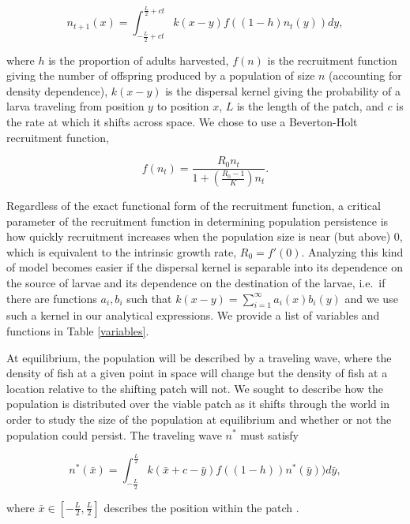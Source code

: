\documentclass[12pt,english]{article}
\begin{document}
\begin{spacing}{1.9}
\begin{flushleft}
\begin{equation}
n_{t+1}(x)=\int^{\frac{L}{2}+ct}_{-\frac{L}{2}+ct}k(x-y)f((1-h)n_t(y))dy \label{integrodifference},
\end{equation}

\noindent where $h$ is the proportion of adults harvested, $f(n)$ is the recruitment function giving the number of 
offspring produced by a population of size $n$ (accounting for density dependence), $k(x-y)$ is the dispersal kernel giving the probability of a  larva traveling from position $y$ to position $x$, $L$ is the length of the patch, and $c$ is the rate at which it  shifts across space.  We chose to use a Beverton-Holt recruitment function,

\[f(n_t)=\frac{R_0n_t}{1+\left(\frac{R_0-1}{K}\right)n_t}.\]  

\noindent Regardless of the exact functional form of the recruitment function, a critical parameter of the recruitment function in determining population persistence is how quickly recruitment increases when the population 
size is near (but above) $0$, which is equivalent to the intrinsic growth rate, $R_0=f'(0)$.  Analyzing this kind of model becomes easier if the dispersal kernel is separable into its dependence on the source of larvae and its dependence on the destination of the larvae, i.e.~if there are functions $a_i, b_i$ such that $k(x- y) = \sum^\infty_{i=1} a_i(x)b_i(y)$ and we use such a kernel in our analytical expressions. We provide a list of variables and functions in Table \ref{variables}. 

At equilibrium, the population will be described by a traveling wave, 
where the density of fish at a given point in space will change but the density of fish at a location relative to the 
shifting  patch will not. We sought to describe how the population is distributed over the viable 
patch as it shifts through the world in order to study the size of the population at equilibrium and whether or not the population could persist.  The traveling wave $n^*$ must 
satisfy

\begin{equation}
n^*(\bar{x})=\int^{\frac{L}{2}}_{-\frac{L}{2}}k(\bar{x}+c-\bar{y})f((1-h))n^*(\bar{y}))d
\bar{y}, \label{traveling_pulse}
\end{equation}

\noindent where $\bar{x}\in\left[-\frac{L}{2}, \frac{L}{2}\right]$ describes the position within the patch \citep{ZhouKot2011}.


\end{flushleft}
\end{spacing}
\end{document}
